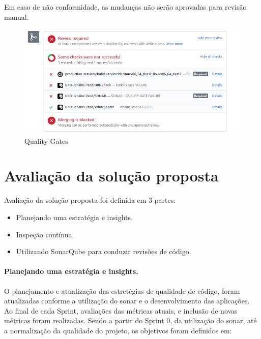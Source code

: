 \documentclass[12pt]{article}
\begin{document}
Em caso de não conformidade, as mudanças não serão aprovadas para revisão manual.
\begin{figure}[H]
	\centering
		\includegraphics[scale=0.5]{img/sonar-check-quality-gate-fail.png}
	\caption{Quality Gates}
	\label{fig:sonar-quality-gates}
\end{figure}


		
\part{Avaliação da solução proposta} \label{sec:avaliacao}
 Avaliação da solução proposta foi definida em 3 partes:
 
 \begin{itemize}
 	\item Planejando uma estratégia e insights.	
 	\item Inspeção contínua.
 	\item Utilizando SonarQube para conduzir revisões de código.
 \end{itemize}

\subsection{Planejando uma estratégia e insights.} \label{sec:sonar-planning}

O planejamento e atualização das estretégias de qualidade de código, foram atualizadas conforme a utilização do sonar e o desenvolvimento das aplicações.
Ao final de cada Sprint, avaliações das métricas atuais, e inclusão de novas métricas foram realizadas.
Sendo a partir do Sprint 0, da utilização do sonar, até a normalização da qualidade do projeto, os objetivos foram definidos em:
\end{document}
